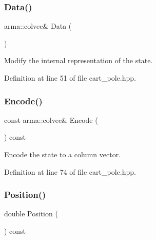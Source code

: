 \subsubsection{Data()}
{\footnotesize\ttfamily arma\+::colvec\& Data (\begin{DoxyParamCaption}{ }\end{DoxyParamCaption})\hspace{0.3cm}{\ttfamily [inline]}}



Modify the internal representation of the state. 



Definition at line 51 of file cart\+\_\+pole.\+hpp.

\mbox{\label{classmlpack_1_1rl_1_1CartPole_1_1State_a8c1a320788b55fad936455caf0acb62a}} 
\subsubsection{Encode()}
{\footnotesize\ttfamily const arma\+::colvec\& Encode (\begin{DoxyParamCaption}{ }\end{DoxyParamCaption}) const\hspace{0.3cm}{\ttfamily [inline]}}



Encode the state to a column vector. 



Definition at line 74 of file cart\+\_\+pole.\+hpp.

\mbox{\label{classmlpack_1_1rl_1_1CartPole_1_1State_adc41cb3d3f5bdd1bd67dc963ce78c20c}} 
\subsubsection{Position()\hspace{0.1cm}{\footnotesize\ttfamily [1/2]}}
{\footnotesize\ttfamily double Position (\begin{DoxyParamCaption}{ }\end{DoxyParamCaption}) const\hspace{0.3cm}{\ttfamily [inline]}}



